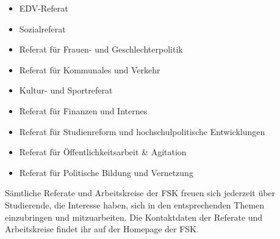 \vspace{-0.6\baselineskip}
\begin{itemize}
 \addtolength{\itemsep}{-0.6\baselineskip}
 \item EDV-Referat
 \item Sozialreferat
 \item Referat für Frauen- und Geschlechterpolitik
 \item Referat für Kommunales und Verkehr
 \item Kultur- und Sportreferat
 \item Referat für Finanzen und Internes
 \item Referat für Studienreform und hochschulpolitische Entwicklungen
 \item Referat für Öffentlichkeitsarbeit \& Agitation
 \item Referat für Politische Bildung und Vernetzung
\end{itemize}

Sämtliche Referate und Arbeitskreise der FSK freuen sich jederzeit über Studierende, die Interesse haben, sich in den entsprechenden Themen einzubringen und mitzuarbeiten. Die Kontaktdaten der Referate und Arbeitskreise findet ihr auf der Homepage der FSK.


